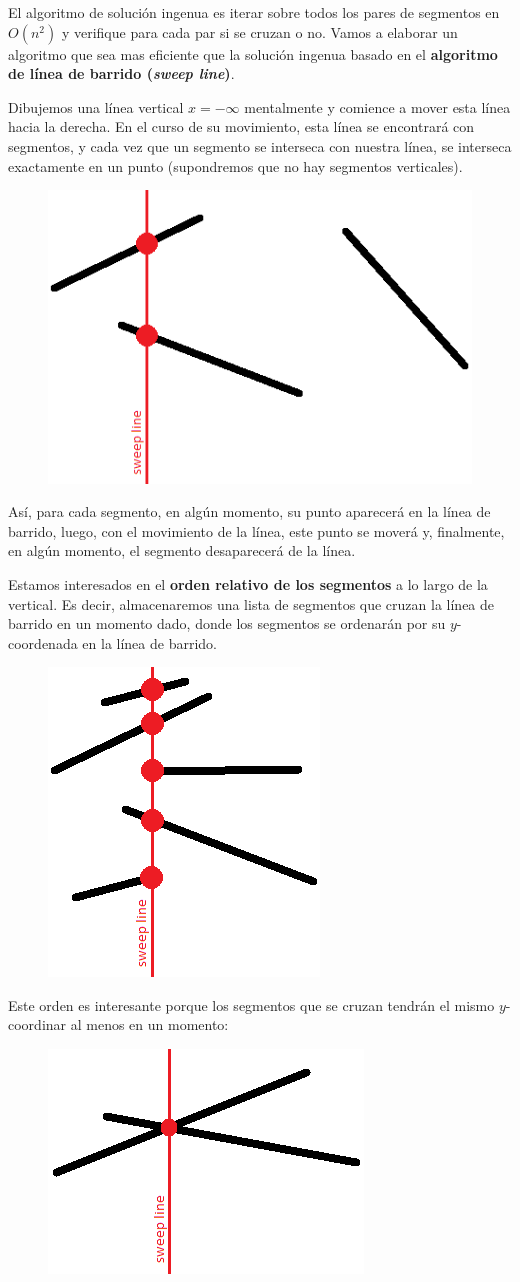 El algoritmo de solución ingenua es iterar sobre todos los pares de segmentos en $O(n^2)$ y verifique para cada par si se cruzan o no. Vamos a elaborar un algoritmo que sea mas eficiente que la solución ingenua basado en el \textbf{algoritmo de línea de barrido (\emph{sweep line})}.

Dibujemos una línea vertical $x = -\infty$ mentalmente y comience a mover esta línea hacia la derecha. En el curso de su movimiento, esta línea se encontrará con segmentos, y cada vez que un segmento se interseca con nuestra línea, se interseca exactamente en un punto (supondremos que no hay segmentos verticales).

\begin{figure}[h!]
	\centering
	\includegraphics[width=0.3\linewidth]{img/sweep_line_1}
	\label{fig:sweepline1}
\end{figure}


Así, para cada segmento, en algún momento, su punto aparecerá en la línea de barrido, luego, con el movimiento de la línea, este punto se moverá y, finalmente, en algún momento, el segmento desaparecerá de la línea.

Estamos interesados en el \textbf{orden relativo de los segmentos} a lo largo de la vertical. Es decir, almacenaremos una lista de segmentos que cruzan la línea de barrido en un momento dado, donde los segmentos se ordenarán por su $y$-coordenada en la línea de barrido.

\begin{figure}[h!]
	\centering
	\includegraphics[width=0.2\linewidth]{img/sweep_line_2}
	\label{fig:sweepline2}
\end{figure}

Este orden es interesante porque los segmentos que se cruzan tendrán el mismo $y$-coordinar al menos en un momento:

\begin{figure}[h!]
	\centering
	\includegraphics[width=0.3\linewidth]{img/sweep_line_3}
	\label{fig:sweepline3}
\end{figure}

